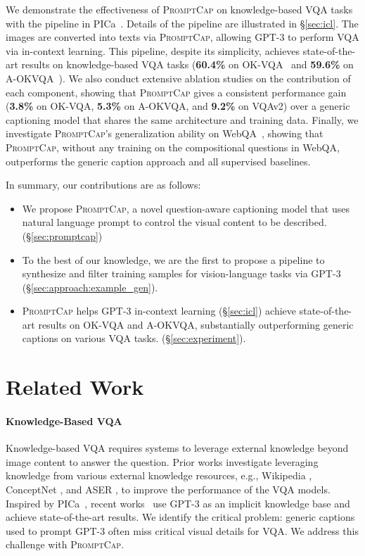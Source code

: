 \documentclass[10pt,twocolumn,letterpaper]{article}
\newcommand{\NAME}{\textsc{PromptCap}\xspace}
\begin{document}
We demonstrate the effectiveness of \NAME on knowledge-based VQA tasks with the pipeline in PICa~\cite{yang2022empirical}.
Details of the pipeline are illustrated in \S\ref{sec:icl}. The images are converted into texts via \NAME, allowing GPT-3 to perform VQA via in-context learning. This pipeline, despite its simplicity, achieves state-of-the-art results on knowledge-based VQA tasks (\textbf{60.4\%} on OK-VQA~\cite{marino2019okvqa} and \textbf{59.6\%} on A-OKVQA~\cite{schwenk2022aokvqa}). We also conduct extensive ablation studies on the contribution of each component, showing that \NAME gives a consistent performance gain (\textbf{3.8\%} on OK-VQA, \textbf{5.3\%} on A-OKVQA, and \textbf{9.2\%} on VQAv2) over a generic captioning model that shares the same architecture and training data. Finally, we investigate \NAME's generalization ability on WebQA~\cite{chang2022webqa}, showing that \NAME, without any training on the compositional questions in WebQA, outperforms the generic caption approach and all supervised baselines.

In summary, our contributions are as follows:

\begin{itemize}
    \item We propose \NAME, a novel question-aware captioning model that uses natural language prompt to control the visual content to be described. (\S\ref{sec:promptcap})
    \item To the best of our knowledge, we are the first to propose a pipeline to synthesize and filter training samples for vision-language tasks via GPT-3 (\S\ref{sec:approach:example_gen}).
    \item \NAME helps GPT-3 in-context learning (\S\ref{sec:icl}) achieve state-of-the-art results on OK-VQA and A-OKVQA, substantially outperforming generic captions on various VQA tasks. (\S\ref{sec:experiment}).

\end{itemize}

%
 \section{Related Work}
\paragraph{Knowledge-Based VQA}
Knowledge-based VQA \cite{marino2019okvqa,schwenk2022aokvqa} requires systems to leverage external knowledge beyond image content to answer the question. 
Prior works  \cite{garderes2020conceptbert, marino2021krisp, wu2022multi, zhu2020mucko,narasimhan2018out,narasimhan2018straight, izacard2020distilling, izacard2020leveraging, Gao_2022_CVPR} investigate leveraging knowledge from various external knowledge resources, e.g., Wikipedia \cite{vrandevcic2014wikidata}, ConceptNet \cite{speer2017conceptnet}, and ASER \cite{zhang2020aser}, to improve the performance of the VQA models. 
Inspired by PICa~\cite{yang2022empirical}, recent works~\cite{gui2022kat, Lin2022REVIVERV} use GPT-3 as an implicit knowledge base and achieve state-of-the-art results. We identify the critical problem:  generic captions used to prompt GPT-3 often miss critical visual details for VQA. We address this challenge with \NAME.
\end{document}
